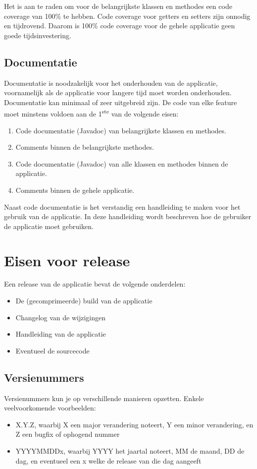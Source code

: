 \documentclass[12pt]{article}
\begin{document}
Het is aan te raden om voor de belangrijkste klassen en methodes een code coverage van 100\% te hebben. Code coverage voor getters en setters zijn onnodig en tijdrovend. Daarom is 100\% code coverage voor de gehele applicatie geen goede tijdsinvestering.

\subsection{Documentatie}
Documentatie is noodzakelijk voor het onderhouden van de applicatie, voornamelijk als de applicatie voor langere tijd moet worden onderhouden. Documentatie kan minimaal of zeer uitgebreid zijn. De code van elke feature moet minstens voldoen aan de 1\textsuperscript{ste} van de volgende eisen:

\begin{enumerate}
	\item Code documentatie (Javadoc) van belangrijkste klassen en methodes.
	\item Comments binnen de belangrijkste methodes.
	\item Code documentatie (Javadoc) van alle klassen en methodes binnen de applicatie.
	\item Comments binnen de gehele applicatie.
\end{enumerate}

\noindent Naast code documentatie is het verstandig een handleiding te maken voor het gebruik van de applicatie. In deze handleiding wordt beschreven hoe de gebruiker de applicatie moet gebruiken.

\pagebreak
\section{Eisen voor release}
Een release van de applicatie bevat de volgende onderdelen:
\begin{itemize}
	\item De (gecomprimeerde) build van de applicatie
	\item Changelog van de wijzigingen
	\item Handleiding van de applicatie
	\item Eventueel de sourcecode
\end{itemize}

\subsection{Versienummers}
Versienummers kun je op verschillende manieren opzetten. Enkele veelvoorkomende voorbeelden:
\begin{itemize}
	\item X.Y.Z, waarbij X een major verandering noteert, Y een minor verandering, en Z een bugfix of ophogend nummer
	\item YYYYMMDDx, waarbij YYYY het jaartal noteert, MM de maand, DD de dag, en eventueel een x welke de release van die dag aangeeft
\end{itemize}
\end{document}

